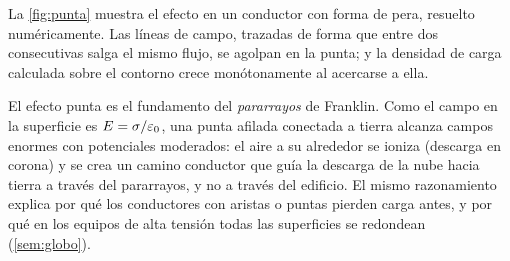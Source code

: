 La \cref{fig:punta} muestra el efecto en un conductor con forma de pera, resuelto numéricamente. Las líneas de campo, trazadas de forma que
entre dos consecutivas salga el mismo flujo, se agolpan en la punta; y la densidad de carga calculada sobre el contorno crece monótonamente al
acercarse a ella.



\begin{observacion}\label{obs:pararrayos}
El efecto punta es el fundamento del \emph{pararrayos} de Franklin. Como el campo en la superficie es $E=\sigma/\varepsilon_{0}$, una punta afilada conectada a
tierra alcanza campos enormes con potenciales moderados: el aire a su alrededor se ioniza (descarga en corona) y se crea un camino conductor
que guía la descarga de la nube hacia tierra a través del pararrayos, y no a través del edificio. El mismo razonamiento explica por qué los
conductores con aristas o puntas pierden carga antes, y por qué en los equipos de alta tensión todas las superficies se redondean
(\cref{sem:globo}).
\end{observacion}
